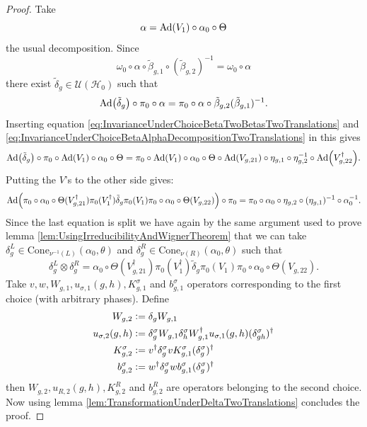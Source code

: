 \documentclass[12pt,a4paper,twoside]{article}
\newcommand{\defeq}{\vcentcolon=}
\let\originalleft\left
\let\originalright\right
\renewcommand{\left}{\mathopen{}\mathclose\bgroup\originalleft}
\renewcommand{\right}{\aftergroup\egroup\originalright}
\newcommand{\UU}{\mathcal U}
\newcommand{\HH}{\mathcal H}
\newcommand{\Ad}[1]{\textrm{Ad}\left(#1\right)}
\theoremstyle{definition}
\numberwithin{equation}{section}
\begin{document}
\begin{proof}
		Take 
	\begin{equation}\label{eq:InvarianceUnderChoiceBetaAlphaDecompositionTwoTranslations}
		\alpha=\Ad{V_1}\circ\alpha_{0}\circ\Theta
	\end{equation}
	the usual decomposition. Since
	\begin{equation}
		\omega_0\circ\alpha\circ\tilde{\beta}_{g,1}\circ(\tilde{\beta}_{g,2})^{-1}=\omega_0\circ\alpha
	\end{equation}
	there exist $\tilde{\delta}_g\in\UU(\HH_0)$ such that
	\begin{equation}
		\Ad{\tilde{\delta}_g}\circ\pi_0\circ\alpha=\pi_0\circ\alpha\circ\tilde{\beta}_{g,2}(\tilde{\beta}_{g,1})^{-1}.
	\end{equation}
	Inserting equation \eqref{eq:InvarianceUnderChoiceBetaTwoBetasTwoTranslations} and \eqref{eq:InvarianceUnderChoiceBetaAlphaDecompositionTwoTranslations} in this gives
	\begin{equation}
		\Ad{\tilde{\delta}_g}\circ\pi_0\circ\Ad{V_1}\circ\alpha_0\circ\Theta=\pi_0\circ\Ad{V_1}\circ\alpha_0\circ\Theta\circ\Ad{V_{g,21}}\circ\eta_{g,1}\circ\eta_{g,2}^{-1}\circ\Ad{V_{g,22}^\dagger}.
	\end{equation}
	Putting the $V$'s to the other side gives:
	\begin{equation}
		\Ad{\pi_0\circ\alpha_0\circ\Theta(V_{g,21}^\dagger)\pi_0(V_1^\dagger)\tilde{\delta}_g\pi_0(V_1)\pi_0\circ\alpha_0\circ\Theta(V_{g,22})}\circ\pi_0=\pi_0\circ\alpha_0\circ\eta_{g,2}\circ(\eta_{g,1})^{-1}\circ\alpha_0^{-1}.
	\end{equation}
	Since the last equation is split we have again by the same argument used to prove lemma \ref{lem:UsingIrreducibilityAndWignerTheorem} that we can take $\delta_g^L\in\textrm{Cone}_{\nu^{-1}(L)}(\alpha_0,\theta)$ and $\delta_g^R\in\textrm{Cone}_{\nu(R)}(\alpha_0,\theta)$ such that
	\begin{equation}
		\delta_g^L\otimes\delta_g^R=\alpha_0\circ\Theta(V_{g,21}^\dagger)\pi_0(V_1^\dagger)\tilde{\delta}_g\pi_0(V_1)\pi_0\circ\alpha_0\circ\Theta(V_{g,22}).
	\end{equation}
	Take $v,w,W_{g,1},u_{\sigma,1}(g,h),K_{g,1}^\sigma$ and $b_{g,1}^\sigma$ operators corresponding to the first choice (with arbitrary phases). Define
	\begin{align}
		W_{g,2}&\defeq\delta_g W_{g,1}\\
		u_{\sigma,2}(g,h)&\defeq \delta_g^\sigma W_{g,1}\delta_h^\sigma W_{g,1}^\dagger u_{\sigma,1}(g,h)(\delta_{gh}^\sigma)^\dagger\\
		K^\sigma_{g,2}&\defeq v^\dagger \delta_g^\sigma v K_{g,1}^\sigma (\delta_g^\sigma)^\dagger\\
		b_{g,2}^\sigma&\defeq w^\dagger\delta^\sigma_g w b_{g,1}^\sigma (\delta^\sigma_g)^\dagger
	\end{align}
	then $W_{g,2},u_{R,2}(g,h),K^R_{g,2}$ and $b^R_{g,2}$ are operators belonging to the second choice. Now using lemma \ref{lem:TransformationUnderDeltaTwoTranslations} concludes the proof.
\end{proof}
\end{document}
